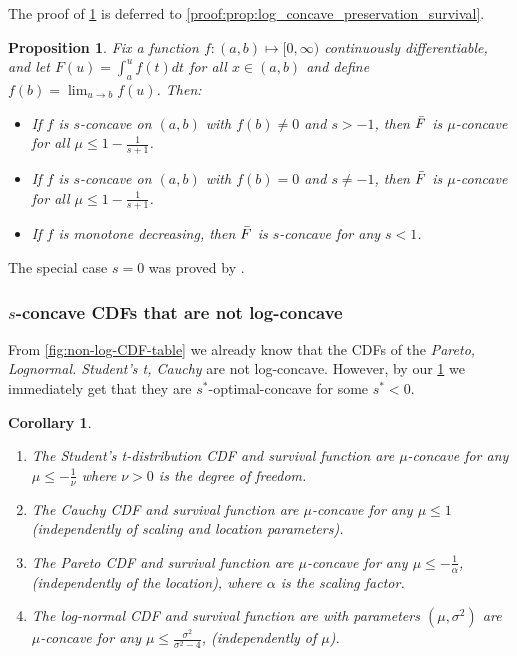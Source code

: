 \documentclass{article} %
\newtheorem{corollary}[theorem]{Corollary}
\newtheorem{proposition}[theorem]{Proposition}
\begin{document}
The proof of \cref{prop:log_concave_preservation_survival} is deferred to \cref{proof:prop:log_concave_preservation_survival}.

\begin{proposition}\label{prop:log_concave_preservation_survival}
Fix a function $f:(a,b)\mapsto [0,\infty)$ continuously differentiable, and let $F(u) = \int_a^u f(t) dt$ for all $x \in (a,b)$ and define $f(b) = \lim_{u \rightarrow b} f(u)$. Then:
\begin{itemize}
    \item[1)] If $f$ is $s$-concave on $(a,b)$ with $f(b) \neq 0$ and $s > -1$, then $\Bar{F}$ is $\mu$-concave for all $\mu\leq 1-\frac{1}{s +1}$.
    \item[2)] If $f$ is $s$-concave on $(a,b)$ with $f(b) = 0$ and $s \neq -1$, then $\Bar{F}$ is $\mu$-concave for all $\mu\leq 1-\frac{1}{s +1}$.
    \item[3)] If $f$ is monotone decreasing, then $\Bar{F}$ is $s$-concave for any $s <1$.
\end{itemize}
\end{proposition}
\noindent
The special case $s = 0$ was proved by \cite{bagnoli2006log}.

\subsubsection{$s$-concave CDFs that are not log-concave}
From \cref{fig:non-log-CDF-table} we already know that the CDFs of the \textit{Pareto, Lognormal. Student's t, Cauchy} are not log-concave. However, by our \cref{prop:log_concave_preservation_survival} we immediately get that they are $s^*$-optimal-concave for some $s^* <0$.

\begin{corollary}\label{d_lambda:cdf}
\begin{enumerate}
    \item The Student's t-distribution CDF and survival function are $\mu$-concave for any $\mu \leq - \frac{1}{\nu}$ where $\nu>0$ is the degree of freedom. 
    \item The Cauchy CDF and survival function are $\mu$-concave for any $\mu \leq 1$ (independently of scaling and location parameters).
    \item The Pareto CDF and survival function are $\mu$-concave for any $\mu \leq -\frac{1}{\alpha}$, (independently of the location), where $\alpha$ is the scaling factor.
    \item The log-normal CDF and survival function are with parameters $(\mu, \sigma^2)$ are $\mu$-concave for any $\mu \leq \frac{\sigma^2}{\sigma^2 - 4}$, (independently of $\mu$).
\end{enumerate}    
\end{corollary}
\end{document}
